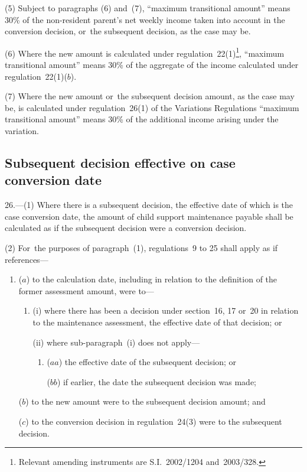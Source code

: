 \documentclass[12pt,a4paper]{article}
\begin{document}
(5) Subject to paragraphs (6) and~(7), “maximum transitional amount” means 30\% of the non-resident parent’s net weekly income taken into account in the conversion decision, or~the subsequent decision, as the case may be.

(6) Where the new amount is calculated under regulation~22(1)\footnote{Relevant amending instruments are S.I.~2002/1204 and~2003/328.}, “maximum transitional amount” means 30\% of the aggregate of the income calculated under regulation~22(1)($b$).

(7) Where the new amount or~the subsequent decision amount, as the case may be, is calculated under regulation~26(1) of the Variations Regulations “maximum transitional amount” means 30\% of the additional income arising under the variation.


\subsection[26. Subsequent decision effective on case conversion date]{Subsequent decision effective on case conversion date}

26.---(1)  Where there is a subsequent decision, the effective date of which is the case conversion date, the amount of child support maintenance payable shall be calculated as if the subsequent decision were a conversion decision.

(2) For~the purposes of paragraph~(1), regulations~9 to 25 shall apply as if references—
\begin{enumerate}\item[]
($a$) to the calculation date, including in relation to the definition of the former assessment amount, were to—
\begin{enumerate}\item[]
(i) where there has been a decision under section~16, 17 or~20 in relation to the maintenance assessment, the effective date of that decision; or

(ii) where sub-paragraph~(i)  does not apply—
\begin{enumerate}\item[]
($aa$) the effective date of the subsequent decision; or

($bb$) if earlier, the date the subsequent decision was made;
\end{enumerate}
\end{enumerate}

($b$) to the new amount were to the subsequent decision amount; and

($c$) to the conversion decision in regulation~24(3) were to the subsequent decision.
\end{enumerate}
\end{document}
